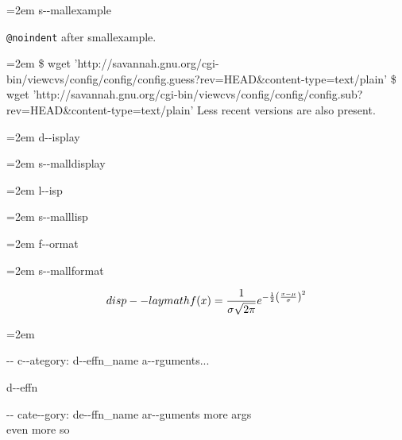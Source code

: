 \documentclass{book}
\begin{document}
\par\begingroup\obeylines\obeyspaces\frenchspacing\leftskip=2em\relax\parskip=0pt\relax\ttfamily\footnotesize{}%
s{-}{-}mallexample
\endgroup{}%

\texttt{@noindent} after smallexample.
\par\begingroup\obeylines\obeyspaces\frenchspacing\leftskip=2em\relax\parskip=0pt\relax\ttfamily\footnotesize{}%
\$ wget 'http://savannah.gnu.org/cgi-bin/viewcvs/config/config/config.guess?rev=HEAD\&content-type=text/plain'
\$ wget 'http://savannah.gnu.org/cgi-bin/viewcvs/config/config/config.sub?rev=HEAD\&content-type=text/plain'
\endgroup{}%
\noindent{}Less recent versions are also present.

\par\begingroup\obeylines\obeyspaces\frenchspacing\leftskip=2em\relax\parskip=0pt\relax{}%
d{-}{-}isplay
\endgroup{}%

\par\begingroup\obeylines\obeyspaces\frenchspacing\leftskip=2em\relax\parskip=0pt\relax\footnotesize{}%
s{-}{-}malldisplay
\endgroup{}%

\par\begingroup\obeylines\obeyspaces\frenchspacing\leftskip=2em\relax\parskip=0pt\relax\ttfamily{}%
l{-}{-}isp
\endgroup{}%

\par\begingroup\obeylines\obeyspaces\frenchspacing\leftskip=2em\relax\parskip=0pt\relax\ttfamily\footnotesize{}%
s{-}{-}malllisp
\endgroup{}%

\par\begingroup\obeylines\obeyspaces\frenchspacing\leftskip=2em\relax\parskip=0pt\relax{}%
f{-}{-}ormat
\endgroup{}%

\par\begingroup\obeylines\obeyspaces\frenchspacing\leftskip=2em\relax\parskip=0pt\relax\footnotesize{}%
s{-}{-}mallformat
\endgroup{}%

\endgroup{}%
$$
disp--laymath
f(x) = {1 \over \sigma \sqrt{2\pi}}e^{-{1 \over 2}\left({x-\mu \over \sigma}\right)^2}
$$
\par\begingroup\obeylines\obeyspaces\frenchspacing\leftskip=2em\relax\parskip=0pt\relax\ttfamily{}%

\hbox{}{-}{-} c{-}{-}ategory: d{-}{-}effn\_name a{-}{-}rguments...


%
d{-}{-}effn

\hbox{}{-}{-} cate{-}{-}gory: de{-}{-}ffn\_name ar{-}{-}guments    more args \leavevmode{}\\ even more so
\end{document}
